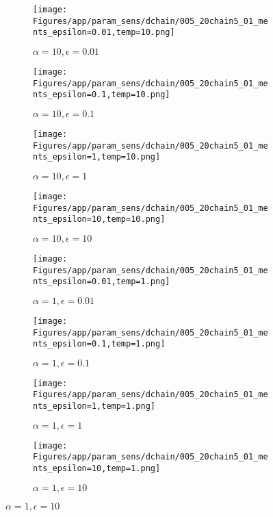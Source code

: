 \documentclass{article}
\theoremstyle{plain}
\begin{document}
\begin{appendices}
\begin{figure}
                \begin{subfigure}[b]{0.24\textwidth}
                    \centering
                    \texttt{[image: Figures/app/param\_sens/dchain/005\_20chain5\_01\_ments\_epsilon=0.01,temp=10.png]}
                    \caption*{$\alpha=10,\epsilon=0.01$}
                \end{subfigure}
                \begin{subfigure}[b]{0.24\textwidth}
                    \centering
                    \texttt{[image: Figures/app/param\_sens/dchain/005\_20chain5\_01\_ments\_epsilon=0.1,temp=10.png]}
                    \caption*{$\alpha=10,\epsilon=0.1$}
                \end{subfigure}
                \begin{subfigure}[b]{0.24\textwidth}
                    \centering
                    \texttt{[image: Figures/app/param\_sens/dchain/005\_20chain5\_01\_ments\_epsilon=1,temp=10.png]}
                    \caption*{$\alpha=10,\epsilon=1$}
                \end{subfigure}
                \begin{subfigure}[b]{0.24\textwidth}
                    \centering
                    \texttt{[image: Figures/app/param\_sens/dchain/005\_20chain5\_01\_ments\_epsilon=10,temp=10.png]}
                    \caption*{$\alpha=10,\epsilon=10$}
                \end{subfigure}
                
                \begin{subfigure}[b]{0.24\textwidth}
                    \centering
                    \texttt{[image: Figures/app/param\_sens/dchain/005\_20chain5\_01\_ments\_epsilon=0.01,temp=1.png]}
                    \caption*{$\alpha=1,\epsilon=0.01$}
                \end{subfigure}
                \begin{subfigure}[b]{0.24\textwidth}
                    \centering
                    \texttt{[image: Figures/app/param\_sens/dchain/005\_20chain5\_01\_ments\_epsilon=0.1,temp=1.png]}
                    \caption*{$\alpha=1,\epsilon=0.1$}
                \end{subfigure}
                \begin{subfigure}[b]{0.24\textwidth}
                    \centering
                    \texttt{[image: Figures/app/param\_sens/dchain/005\_20chain5\_01\_ments\_epsilon=1,temp=1.png]}
                    \caption*{$\alpha=1,\epsilon=1$}
                \end{subfigure}
                \begin{subfigure}[b]{0.24\textwidth}
                    \centering
                    \texttt{[image: Figures/app/param\_sens/dchain/005\_20chain5\_01\_ments\_epsilon=10,temp=1.png]}
                    \caption*{$\alpha=1,\epsilon=10$}
                \end{subfigure}
                

\end{figure}
\end{appendices}
\end{document}
